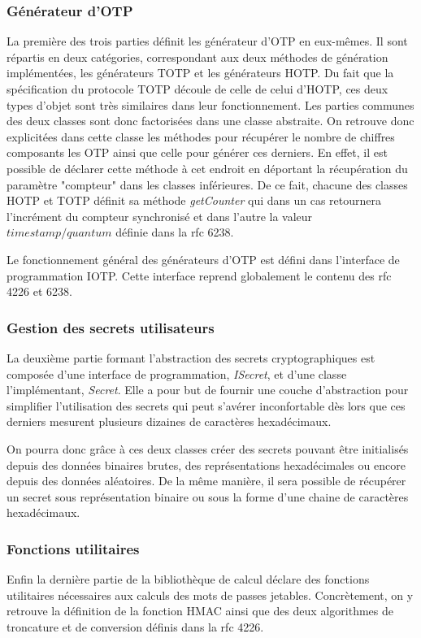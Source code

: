 \subsubsection{Générateur d'OTP}
La première des trois parties définit les générateur d'OTP en eux-mêmes. Il sont répartis en
deux catégories, correspondant aux deux méthodes de génération implémentées, les générateurs
TOTP et les générateurs HOTP. Du fait que la spécification du protocole TOTP découle de celle
de celui d'HOTP, ces deux types d'objet sont très similaires dans leur fonctionnement. Les
parties communes des deux classes sont donc factorisées dans une classe abstraite. On
retrouve donc explicitées dans cette classe les méthodes pour récupérer le nombre de chiffres
composants les OTP ainsi que celle pour générer ces derniers. En effet, il est possible de
déclarer cette méthode à cet endroit en déportant la récupération du paramètre "compteur"
dans les classes inférieures. De ce fait, chacune des classes HOTP et TOTP définit sa
méthode \emph{getCounter} qui dans un cas retournera l'incrément du compteur synchronisé et
dans l'autre la valeur $ timestamp / quantum $ définie dans la rfc 6238\cite{TOTP}.

Le fonctionnement général des générateurs d'OTP est défini dans l'interface de
programmation IOTP. Cette interface reprend globalement le contenu des rfc 4226 et 6238.

\subsubsection{Gestion des secrets utilisateurs}
La deuxième partie formant l'abstraction des secrets cryptographiques est composée d'une
interface de programmation, \emph{ISecret}, et d'une classe l'implémentant, \emph{Secret}.
Elle a pour but de fournir une couche d'abstraction pour simplifier l'utilisation des secrets
qui peut s'avérer inconfortable dès lors que ces derniers mesurent plusieurs dizaines de
caractères hexadécimaux.

On pourra donc grâce à ces deux classes créer des secrets pouvant être initialisés depuis des
données binaires brutes, des représentations hexadécimales ou encore depuis des données
aléatoires. De la même manière, il sera possible de récupérer un secret sous représentation
binaire ou sous la forme d'une chaine de caractères hexadécimaux.

\subsubsection{Fonctions utilitaires}
Enfin la dernière partie de la bibliothèque de calcul déclare des fonctions utilitaires
nécessaires aux calculs des mots de passes jetables. Concrètement, on y retrouve la
définition de la fonction HMAC\cite{HMACrfc} ainsi que des deux algorithmes de troncature et
de conversion définis dans la rfc 4226.

